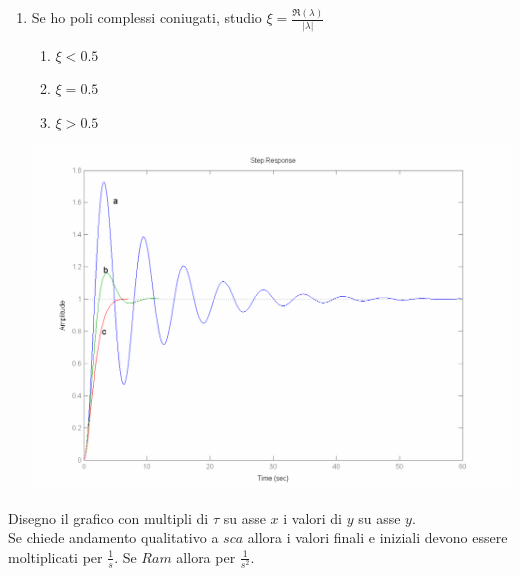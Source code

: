 \documentclass[10pt,landscape, a4paper]{scrartcl} %
\begin{document}
\begin{multicols*}{3}
\begin{enumerate}
	\item Se ho poli complessi coniugati, studio $\xi = \frac{\Re(\lambda)}{|\lambda|}$
	    \begin{multicols*}{2}
			\begin{enumerate}
			\item $\xi < 0.5$
			\item $\xi = 0.5$
			\item $\xi > 0.5$
		\end{enumerate} \includegraphics*[width=1\columnwidth]{xi.png}
		\end{multicols*}
		
\end{enumerate}
Disegno il grafico con multipli di $\tau$ su asse $x$ i valori di $y$ su asse $y$.\\
Se chiede andamento qualitativo a $sca$ allora i valori finali e iniziali devono essere moltiplicati per $\frac{1}{s}$. Se $Ram$ allora per $\frac{1}{s^2}$.




\end{multicols*}
\end{document}
